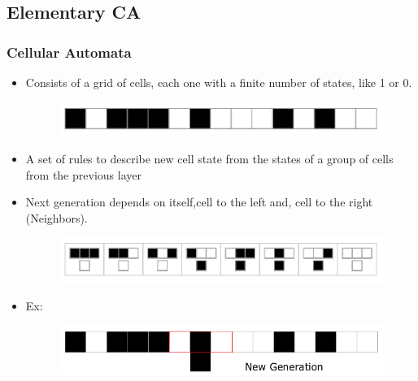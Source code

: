 \documentclass{beamer}
\begin{document}
\subsection{Elementary CA}
\begin{frame}
    \frametitle{Cellular Automata}
    \begin{itemize}
        \item Consists of a grid of cells, each one with a finite number of states, like 1 or 0.
        \begin{figure}
            \centering
            \includegraphics[scale=0.4]{grid.pdf}
        \end{figure}
        \item A set of rules to describe new cell state from the states of a group of cells from the previous layer
        \item Next generation depends on itself,cell to the left and, cell to the right (Neighbors).
        \begin{figure}[H]
            \includegraphics[scale=0.5]{rulerule30}
        \end{figure}
        \item Ex:
        \begin{figure}
            \centering
            \includegraphics[scale=0.4]{IMG.png}
        \end{figure}
    \end{itemize}
\end{frame}
\end{document}
